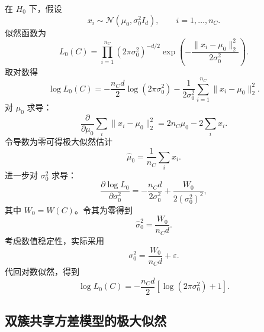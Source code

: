 \documentclass[UTF8,a4paper,12pt,fontset=none]{ctexart}
\newcommand{\epsv}{\varepsilon}
\begin{document}
在 \(H_0\) 下，假设
\begin{equation}
x_i\sim\mathcal N(\mu_0,\sigma_0^2I_d),\qquad i=1,\ldots,n_C .
\end{equation}
似然函数为
\begin{equation}
L_0(C)
=\prod_{i=1}^{n_C}
(2\pi\sigma_0^2)^{-d/2}
\exp\left(
-\frac{\|x_i-\mu_0\|_2^2}{2\sigma_0^2}
\right).
\end{equation}
取对数得
\begin{equation}
\log L_0(C)
=-\frac{n_Cd}{2}\log(2\pi\sigma_0^2)
-\frac{1}{2\sigma_0^2}
\sum_{i=1}^{n_C}\|x_i-\mu_0\|_2^2 .
\end{equation}
对 \(\mu_0\) 求导：
\begin{equation}
\frac{\partial}{\partial\mu_0}
\sum_i\|x_i-\mu_0\|_2^2
=2n_C\mu_0-2\sum_i x_i .
\end{equation}
令导数为零可得极大似然估计
\begin{equation}
\hat\mu_0=\frac{1}{n_C}\sum_i x_i .
\end{equation}
进一步对 \(\sigma_0^2\) 求导：
\begin{equation}
\frac{\partial \log L_0}{\partial \sigma_0^2}
=-\frac{n_Cd}{2\sigma_0^2}
+\frac{W_0}{2(\sigma_0^2)^2},
\end{equation}
其中 \(W_0=W(C)\)。令其为零得到
\begin{equation}
\hat\sigma_0^2=\frac{W_0}{n_Cd}.
\end{equation}
考虑数值稳定性，实际采用
\begin{equation}
\sigma_0^2=\frac{W_0}{n_Cd}+\epsv .
\end{equation}
代回对数似然，得到
\begin{equation}
\log L_0(C)
=-\frac{n_Cd}{2}
\left[\log(2\pi\sigma_0^2)+1\right].
\label{eq:loglik_single}
\end{equation}

\subsection{双簇共享方差模型的极大似然}
\end{document}
